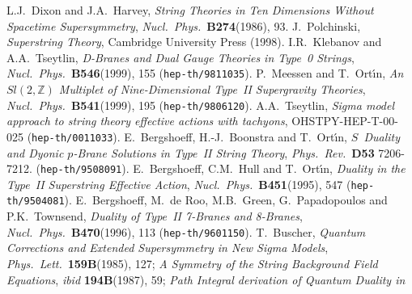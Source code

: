 \documentclass[12pt,a4paper]{article}
\begin{document}
\begin{thebibliography}{99}
%
 L.J.~Dixon and J.A.~Harvey,
                  {\sl String Theories in Ten Dimensions Without 
                  Spacetime Supersymmetry},
                  {\it Nucl.~Phys.}~{\bf B274}(1986), 93.
%
 J.~Polchinski,
                   {\sl Superstring Theory},
                   Cambridge University Press (1998).
%
 I.R.~Klebanov and A.A.~Tseytlin,
                  {\sl D-Branes and Dual Gauge Theories
                  in Type~0 Strings},
                  {\it Nucl.~Phys.}~{\bf B546}(1999), 155
                 ({\tt hep-th/9811035}).
%
%
 P.~Meessen and T.~Ort\'{\i}n,
                {\sl An $Sl(2,\mathbb{Z})$ Multiplet of Nine-Dimensional 
                Type~II Supergravity Theories},
                {\it Nucl.~Phys.}~{\bf B541}(1999), 195
                ({\tt hep-th/9806120}).
%
 A.A.~Tseytlin,
                 {\sl Sigma model approach to string theory
                 effective actions with tachyons},
                 OHSTPY-HEP-T-00-025
                 ({\tt hep-th/0011033}).
%
 E.~Bergshoeff, H.-J.~Boonstra and T.~Ort\'{\i}n,
                 {\sl $S$~Duality and Dyonic $p$-Brane Solutions
                 in Type~II String Theory},
                 {\it Phys.~Rev.}~{\bf D53} 7206-7212.
                 ({\tt hep-th/9508091}).
%
 E.~Bergshoeff, C.M.~Hull and T.~Ort\'{\i}n,
                 {\sl Duality in the Type~II Superstring Effective
                  Action},
                 {\it Nucl.~Phys.}~{\bf B451}(1995), 547
                 ({\tt hep-th/9504081}).
%
 E.~Bergshoeff, M.~de Roo, M.B.~Green,
                   G.~Papadopoulos and P.K.~Townsend,
                 {\sl Duality of Type~II 7-Branes and 8-Branes},
                   {\it Nucl.~Phys.}~{\bf B470}(1996), 113
                  ({\tt hep-th/9601150}).
%
 T.~Buscher,
         {\sl Quantum Corrections and Extended Supersymmetry
                in New Sigma Models},
                {\it Phys.~Lett.}~{\bf 159B}(1985), 127;
                {\sl A Symmetry of the String Background Field
                Equations},
                {\it ibid} {\bf 194B}(1987), 59;
          {\sl Path Integral derivation of Quantum Duality in
}
\end{thebibliography}
\end{document}
